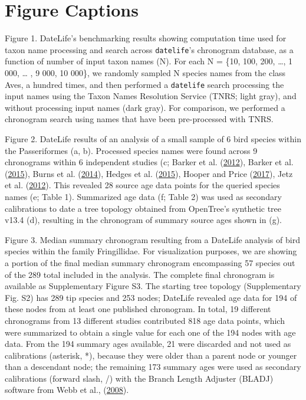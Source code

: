 \documentclass[english,man]{apa6}
\begin{document}
\endgroup

\hypertarget{figure-captions}{%
\section{Figure Captions}\label{figure-captions}}

Figure 1. DateLife's benchmarking results showing computation time used for taxon name processing and search across \texttt{datelife}'s chronogram database, as a function of number of input taxon names (N). For each N = \{10, 100, 200, \ldots{}, 1 000, \ldots{} , 9 000, 10 000\}, we randomly sampled N species names from the class Aves, a hundred times, and then performed a \texttt{datelife} search processing the input names using the Taxon Names Resolution Service (TNRS; light gray), and without processing input names (dark gray). For comparison, we performed a chronogram search using names that have been pre-processed with TNRS.

Figure 2. DateLife results of an analysis of a small sample of 6 bird species within the Passeriformes (a, b). Processed species names were found across 9 chronograms within 6 independent studies (c; Barker et al. (\protect\hyperlink{ref-barker2012going}{2012}), Barker et al. (\protect\hyperlink{ref-barker2015new}{2015}), Burns et al. (\protect\hyperlink{ref-burns2014phylogenetics}{2014}), Hedges et al. (\protect\hyperlink{ref-Hedges2015}{2015}), Hooper and Price (\protect\hyperlink{ref-hooper2017chromosomal}{2017}), Jetz et al. (\protect\hyperlink{ref-Jetz2012}{2012}). This revealed 28 source age data points for the queried species names (e; Table 1). Summarized age data (f; Table 2) was used as secondary calibrations to date a tree topology obtained from OpenTree's synthetic tree v13.4 (d), resulting in the chronogram of summary source ages shown in (g).

Figure 3. Median summary chronogram resulting from a DateLife analysis of bird species within the family Fringillidae. For visualization purposes, we are showing a portion of the final median summary chronogram encompassing 57 species out of the 289 total included in the analysis. The complete final chronogram is available as Supplementary Figure S3. The starting tree topology (Supplementary Fig. S2) has 289 tip species and 253 nodes; DateLife revealed age data for 194 of these nodes from at least one published chronogram. In total, 19 different chronograms from 13 different studies contributed 818 age data points, which were summarized to obtain a single value for each one of the 194 nodes with age data. From the 194 summary ages available, 21 were discarded and not used as calibrations (asterisk, *), because they were older than a parent node or younger than a descendant node; the remaining 173 summary ages were used as secondary calibrations (forward slash, /) with the Branch Length Adjuster (BLADJ) software from Webb et al., (\protect\hyperlink{ref-Webb2008}{2008}).
\end{document}
